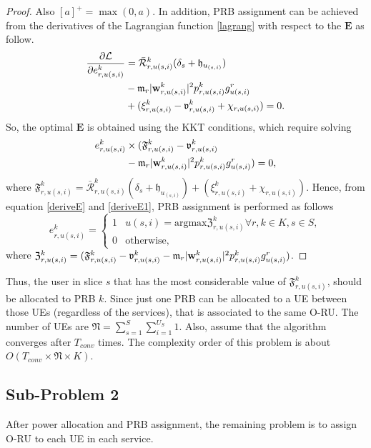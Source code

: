 \documentclass[lettersize,journal]{IEEEtran}
\begin{document}
\begin{proof}
Also $[a]^+ = \max(0,a)$.
In addition, PRB assignment can be achieved from the derivatives of the Lagrangian function \eqref{lagrang} with respect to the $\boldsymbol{E}$ as follow.
\begin{align}\label{deriveE}
\dfrac{\partial\mathcal{L}}{\partial e_{r,u(s,i)}^{k}} &= \mathcal{\bar{R}}_{r,u(s,i)}^{k}(\delta_s+\mathfrak{h}_{u_{(s,i)}})\nonumber\\
&- \mathfrak{m}_{r}|\bold{w}_{r,u(s,i)}^{k}|^2 p_{r,u(s,i)}^{k} g_{u(s,i)}^r\nonumber\\
&+( \xi^{k}_{r,u(s,i)}-\mathfrak{v}^{k}_{r,u(s,i)} +\chi_{r,u(s,i)})=0.
\end{align}
So, the optimal $\boldsymbol{E}$ is obtained using the KKT conditions, which require solving
\begin{align}\label{deriveE1}
e_{r,u(s,i)}^{k} &\times (\mathfrak{F}^{k}_{r,u(s,i)} -\mathfrak{v}^{k}_{r,u(s,i)}\nonumber\\
& - \mathfrak{m}_{r}|\bold{w}_{r,u(s,i)}^{k}|^2 p_{r,u(s,i)}^{k} g_{u(s,i)}^r ) = 0,
\end{align}
where $\mathfrak{F}^{k}_{r,u(s,i)} =\mathcal{\bar{R}}_{r,u(s,i)}^{k}(\delta_s+\mathfrak{h}_{u_{(s,i)}})+( \xi^{k}_{r,u(s,i)} +\chi_{r,u(s,i)}) $.
Hence, from equation \eqref{deriveE} and \eqref{deriveE1}, PRB assignment is performed as follows
\begin{equation}
e_{r,u(s,i)}^{k} =
  \begin{cases}
      1 & u(s,i) = \text{argmax} \mathfrak{Z}^{k}_{r,u(s,i)} \forall r, k \in K, s \in S, \\
      0 & \text{otherwise,}
    \end{cases}
\end{equation}
where $\mathfrak{Z}^{k}_{r,u(s,i)} = (\mathfrak{F}^{k}_{r,u(s,i)} -\mathfrak{v}^{k}_{r,u(s,i)}- \mathfrak{m}_{r}|\bold{w}_{r,u(s,i)}^{k}|^2 p_{r,u(s,i)}^{k} g_{u(s,i)}^r )$.
 \end{proof}
Thus, the user in slice $s$ that has  the most considerable value of $\mathfrak{F}^{k}_{r,u(s,i)}$, should be allocated to PRB $k$. Since just one PRB can be allocated to a UE between those UEs (regardless of the services), that is associated to the same O-RU.
The number of UEs are $\mathfrak{N} = \sum_{s=1}^{S}\sum_{i=1}^{U_S}1$. Also, assume that the algorithm converges after $T_{conv}$ times.
The complexity order of this problem is about $O( T_{conv} \times\mathfrak{N} \times K)$.
\subsection{Sub-Problem 2}\label{sub2}
After power allocation and PRB assignment, the remaining problem is to assign O-RU to each UE in each service.
\end{document}
